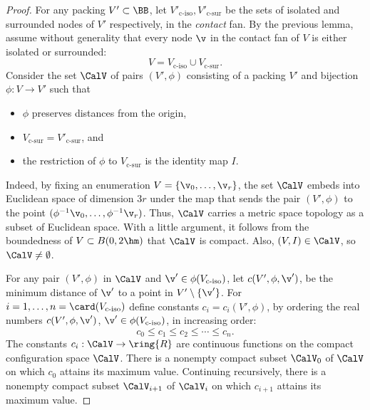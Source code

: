 \begin{proof} For any packing $V'\subset \BB$, let $V'_{\text{c-iso}},V'_{\text{c-sur}}$
  be the sets of isolated and surrounded nodes of $V'$
  respectively, in the {\it contact} fan.  By the previous lemma,
  assume without generality that every node $\v$ in the contact fan
  of $V$ is either isolated or surrounded:
\begin{displaymath}
V = V_{\text{c-iso}} \cup V_{\text{c-sur}}.
\end{displaymath}
Consider the set $\CalV$ of pairs $(V',\phi)$ consisting of a packing $V'$
and bijection $\phi:V\to V'$ such that
\begin{itemize}
\item $\phi$ preserves distances from the origin, 
\item $V_{\text{c-sur}}=V'_{\text{c-sur}}$, and 
\item the restriction of $\phi$ to $V_{\text{c-sur}}$ is the identity map $I$.
\end{itemize}
%

Indeed, by fixing an enumeration $V = \{\v_0,\ldots,\v_r\}$, the set
$\CalV$ embeds into Euclidean space of dimension $3r$ under the map
that sends the pair $(V',\phi)$ to the point
$(\phi^{-1}\v_0,\ldots,\phi^{-1}\v_r)$.  Thus, $\CalV$ carries a
metric space topology as a subset of Euclidean space.  With a little
argument, it follows from the boundedness of $V\subset B(0,2\hm)$ that
$\CalV$ is compact.  Also, $(V,I)\in \CalV$, so $\CalV\ne\emptyset$.


For any pair $(V',\phi)$ in $\CalV$ and $\v'\in \phi(V_{\text{c-iso}})$, let
$c(V',\phi,\v')$, be the minimum distance of $\v'$ to a point in
$V'\setminus \{\v'\}$.  For $i=1,\ldots,n=\card(V_{\text{c-iso}})$ define
constants $c_i=c_i(V',\phi)$, by ordering the real numbers
$c(V',\phi,\v')$, $\v'\in\phi(V_{\text{c-iso}})$, in increasing order:
\begin{displaymath}
c_0 \le c_1 \le c_2 \le \cdots \le c_n.
\end{displaymath}
The constants $c_i:\CalV\to\ring{R}$ are continuous functions on the
compact configuration space $\CalV$.  There is a nonempty compact
subset $\CalV_0$ of $\CalV$ on which $c_0$ attains its maximum
value. Continuing recursively, there is a nonempty compact subset
$\CalV_{i+1}$ of $\CalV_{i}$ on which $c_{i+1}$ attains its maximum value.
%
%


\end{proof}
